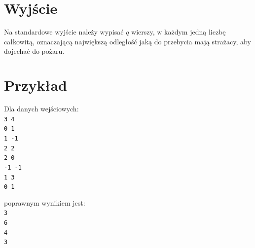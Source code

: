 \documentclass[10pt]{article}
\begin{document}

    \section*{Wyjście}
    
    Na standardowe wyjście należy wypisać $q$ wierszy, w każdym jedną liczbę całkowitą, oznaczającą największą odległość jaką do przebycia mają strażacy, aby dojechać do pożaru. 


    \section*{Przykład}
    
    \noindent
    \begin{minipage}[t]{0.5\textwidth}
        Dla danych wejściowych:\vspace{1ex}\\
        \texttt{3 4\\0 1\\1 -1\\2 2\\2 0\\-1 -1\\1 3\\0 1}
    \end{minipage}
    \begin{minipage}[t]{0.5\textwidth}
        poprawnym wynikiem jest:\vspace{1ex}\\
        \texttt{3\\6\\4\\3}
    \end{minipage}
    
\end{document}
